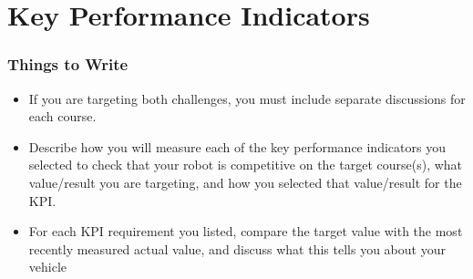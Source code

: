 \section{Key Performance Indicators}
\subsubsection*{Things to Write}

\begin{itemize}
  \item If you are targeting both challenges, you must include separate discussions for each course.
  \item Describe how you will measure each of the key performance indicators you selected to check that your robot is competitive on the target course(s), what value/result you are targeting, and how you selected that value/result for the KPI.
  \item For each KPI requirement you listed, compare the target value with the most recently measured actual value, and discuss what this tells you about your vehicle
\end{itemize}
